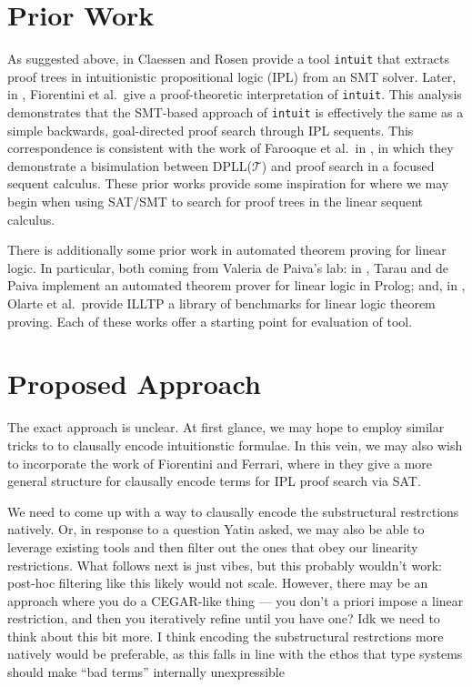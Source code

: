 \documentclass{article}
\begin{document}

\section{Prior Work}
As suggested above, in
\cite{claessen2015sat} Claessen and Rosen provide a tool \texttt{intuit} that extracts proof trees in intuitionistic propositional
logic (IPL) from an SMT solver. Later, in \cite{fiorentini2019proof}, Fiorentini et al.\ give a proof-theoretic
interpretation of \texttt{intuit}. This analysis demonstrates that the SMT-based approach
of \texttt{intuit} is effectively the same as a simple backwards, goal-directed
proof search through IPL sequents. This correspondence is consistent with the
work of Farooque et al.\ in \cite{farooque2013bisimulation}, in which they
demonstrate a bisimulation between DPLL($\mathcal{T}$) and proof search in a
focused sequent calculus. These prior works provide some inspiration for where
we may begin when using SAT/SMT to search for proof trees in the linear sequent
calculus.

There is additionally some prior work in automated theorem proving for linear
logic. In particular,  both coming from Valeria de Paiva's lab: in
\cite{tarau2020deriving}, Tarau and de
Paiva implement an automated theorem prover for linear logic in Prolog; and, in
\cite{DBLP:journals/corr/abs-1904-06850}, Olarte et al.\ provide ILLTP a library
of benchmarks for linear logic theorem proving. Each of these works offer a
starting point for evaluation of tool.

\section{Proposed Approach}
The exact approach is unclear. At first glance, we may hope to employ similar
tricks to \cite{claessen2015sat} to clausally encode intuitionstic formulae. In
this vein, we may also wish to incorporate the work of Fiorentini and Ferrari,
where in \cite{fiorentini2024general} they give a more general structure for
clausally encode terms for IPL proof search via SAT.

We need to come up with a way to clausally encode the substructural restrctions natively.
Or, in response to a question Yatin asked, we may also be able to leverage
existing tools and then filter out the ones that obey our linearity
restrictions. What follows next is just vibes, but this probably wouldn't work:
post-hoc filtering like this likely would not scale. However, there may be an
approach where you do a CEGAR-like thing --- you don't a priori impose a linear
restriction, and then you iteratively refine until you have one? Idk we need to
think about this bit more. I think encoding the substructural restrctions more
natively would be preferable, as this falls in line with the ethos that type
systems should make ``bad terms'' internally unexpressible
\end{document}
